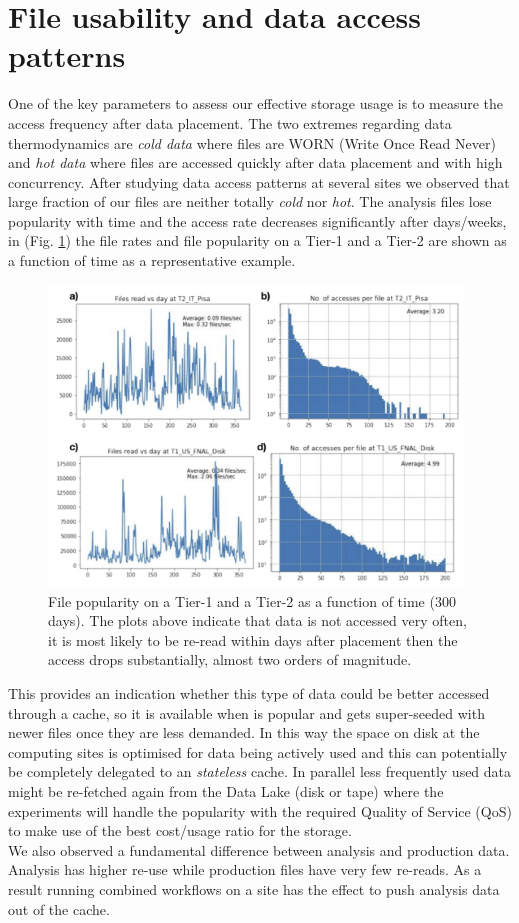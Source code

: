 \section{File usability and data access patterns}
One of the key parameters to assess our effective storage usage is to measure the access frequency after data placement. The two extremes regarding data thermodynamics are \emph{cold data} where files are WORN (Write Once Read Never) and \emph{hot data} where files are accessed quickly after data placement and with high concurrency. After studying data access patterns at several sites we observed that large fraction of our files are neither totally \emph{cold} nor \emph{hot}. The analysis files lose popularity with time and the access rate decreases significantly after days/weeks, in (Fig. \ref{access}) the file rates and file popularity on a Tier-1 and a Tier-2 are shown as a function of time as a representative example.

\begin{figure}[h]
  \centering
  \includegraphics[height=8cm]{dataaccess-chep2019.png}
  \caption{File popularity on a Tier-1 and a Tier-2 as a function of time (300 days). The plots above indicate that data is not accessed very often, it is most likely to be re-read within days after placement then the access drops substantially, almost two orders of magnitude.}
  \label{access}
\end{figure}

This provides an indication whether this type of data could be better accessed through a cache, so it is available when is popular and gets super-seeded with newer files once they are less demanded. In this way the space on disk at the computing sites is optimised for data being actively used and this can potentially be completely delegated to an \emph{stateless} cache. In parallel less frequently used data might be re-fetched again from the Data Lake (disk or tape) where the experiments will handle the popularity with the required Quality of Service (QoS) to make use of the best cost/usage ratio for the storage.\\
We also observed a fundamental difference between analysis and production data. Analysis has higher re-use while production files have very few re-reads. As a result running combined workflows on a site has the effect to push analysis data out of the cache.

